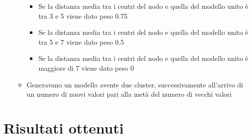 \begin{itemize}
\begin{itemize}
\begin{itemize}
            \item Se la distanza media tra i centri del nodo e quella del modello unito è tra 3 e 5 viene dato peso 0.75
            \item Se la distanza media tra i centri del nodo e quella del modello unito è tra 5 e 7 viene dato peso 0.5
            \item Se la distanza media tra i centri del nodo e quella del modello unito è maggiore di 7 viene dato peso 0
          \end{itemize}
      \item Generavano un modello avente due cluster, successivamente all'arrivo di un numero di nuovi valori pari alla metà del numero di vecchi valori
    \end{itemize}
\end{itemize}
\section{Risultati ottenuti}
